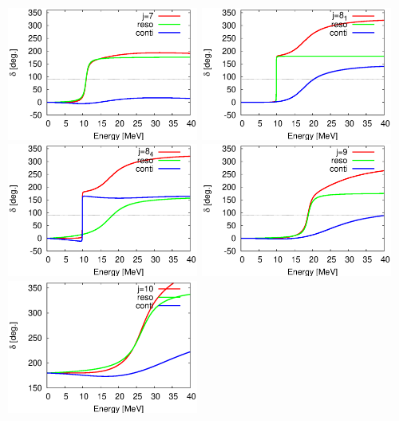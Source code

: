\documentclass[english,12pt]{jsarticle}
\begin{document}
 \begin{figure}
 \begin{minipage}{0.6\textwidth}
  \includegraphics[width=5cm]{allphs_7.eps}
 \end{minipage}
 \begin{minipage}{0.6\textwidth}
  \includegraphics[width=5cm]{allphs_8_1.eps}
 \end{minipage}
 \begin{minipage}{0.6\textwidth}
  \includegraphics[width=5cm]{allphs_8_4.eps}
 \end{minipage}
 \begin{minipage}{0.6\textwidth}
  \includegraphics[width=5cm]{allphs_9.eps}
 \end{minipage}
 \begin{minipage}{0.6\textwidth}
  \includegraphics[width=5cm]{allphs_10.eps}
 \end{minipage}
\end{figure}
\end{document}
